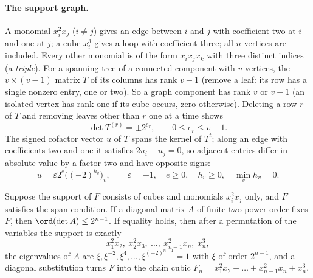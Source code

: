 \paragraph{The support graph.}
A monomial $x_i^2x_j$ ($i\ne j$) gives an edge between $i$ and $j$ with
coefficient two at $i$ and one at $j$; a cube $x_i^3$ gives a loop with
coefficient three; all $n$ vertices are included. Every other monomial is of
the form $x_ix_jx_k$ with three distinct indices (a \emph{triple}). For a
spanning tree of a connected component with $v$ vertices, the $v\times(v-1)$
matrix $T$ of its columns has rank $v-1$ (remove a leaf: its row has a single
nonzero entry, one or two). So a graph component has rank $v$ or $v-1$ (an
isolated vertex has rank one if its cube occurs, zero otherwise). Deleting a
row $r$ of $T$ and removing leaves other than $r$ one at a time shows
\begin{equation}\label{eq:treeminor}
 \det T^{(r)}=\pm2^{e_r},\qquad 0\le e_r\le v-1 .
\end{equation}
The signed cofactor vector $u$ of $T$ spans the kernel of $T^t$; along an edge
with coefficients two and one it satisfies $2u_i+u_j=0$, so adjacent entries
differ in absolute value by a factor two and have opposite signs:
\begin{equation}\label{eq:cofactor}
 u=\varepsilon2^{e}\bigl((-2)^{h_v}\bigr)_v,\qquad
 \varepsilon=\pm1,\quad e\ge0,\quad h_v\ge0,\quad\min_vh_v=0 .
\end{equation}

\begin{proposition}\label{prop:graphsupport}
Suppose the support of $F$ consists of cubes and monomials $x_i^2x_j$ only, and
$F$ satisfies the span condition. If a diagonal matrix $A$ of finite two-power
order fixes $F$, then $\ord(\det A)\le2^{n-1}$. If equality holds, then after
a permutation of the variables the support is exactly
\begin{equation}\label{eq:chainsupport}
 x_1^2x_2,\ x_2^2x_3,\ \dots,\ x_{n-1}^2x_n,\ x_n^3,
\end{equation}
the eigenvalues of $A$ are $\xi,\xi^{-2},\xi^4,\dots,\xi^{(-2)^{n-1}}=1$ with
$\xi$ of order $2^{n-1}$, and a diagonal substitution turns $F$ into the chain
cubic $F_n=x_1^2x_2+\dots+x_{n-1}^2x_n+x_n^3$.
\end{proposition}

